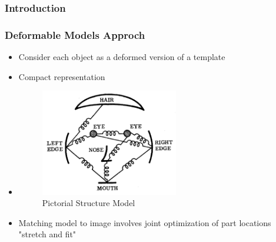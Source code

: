 \documentclass[xcolor=dvipsnames]{beamer}
\begin{document}
\subsubsection{Introduction}
\begin{frame}
	\frametitle{Deformable Models Approch}
	\large
	\begin{itemize}
		\item Consider each object as a deformed version of a template
		\item Compact representation
	
	\item[] \begin{figure}
		\includegraphics[width=6.0cm]{img/dpmMot.png}
		\caption{Pictorial Structure Model \cite{dpmMot}}
	\end{figure}
	
	\item[] Matching model to image involves joint optimization of part locations "stretch and fit"
	\end{itemize}
\end{frame}
\end{document}
